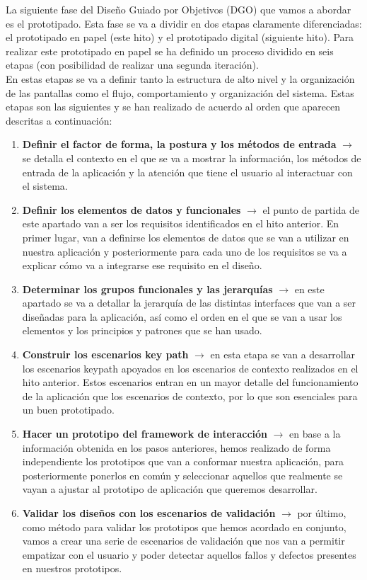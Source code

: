 
La siguiente fase del Diseño Guiado por Objetivos (DGO) que vamos a abordar es
el prototipado. Esta fase se va a dividir en dos etapas claramente
diferenciadas: el prototipado en papel (este hito) y el prototipado digital
(siguiente hito). Para realizar este prototipado en papel se ha definido un
proceso dividido en seis etapas (con posibilidad de realizar una segunda
iteración). \\

En estas etapas se va a definir tanto la estructura de alto nivel y la
organización de las pantallas como el flujo, comportamiento y organización del
sistema. Estas etapas son las siguientes y se han realizado de acuerdo al orden
que aparecen descritas a continuación:
\begin{enumerate}
    \item \textbf{Definir el factor de forma, la postura y los métodos de entrada} $\rightarrow$ se detalla el contexto en el que se va a mostrar la información, los
    métodos de entrada de la aplicación y la atención que tiene el usuario al interactuar con el sistema.
    \item \textbf{Definir los elementos de datos y funcionales} $\rightarrow$ el punto de partida de este apartado van a ser los requisitos identificados en el hito anterior.
    En primer lugar, van a definirse los elementos de datos que se van a utilizar en nuestra aplicación y posteriormente para cada uno de los requisitos se va a explicar
    cómo va a integrarse ese requisito en el diseño.
    \item \textbf{Determinar los grupos funcionales y las jerarquías} $\rightarrow$ en este apartado se va a detallar la jerarquía de las distintas interfaces que van a 
    ser diseñadas para la aplicación, así como el orden en el que se van a usar los elementos y los principios y patrones que se han usado.
    \item \textbf{Construir los escenarios key path} $\rightarrow$ en esta etapa se van a desarrollar los escenarios keypath apoyados en los escenarios de contexto realizados
    en el hito anterior. Estos escenarios entran en un mayor detalle del funcionamiento de la aplicación que los escenarios de contexto, por lo que son esenciales para
    un buen prototipado.
    \item \textbf{Hacer un prototipo del framework de interacción} $\rightarrow$ en base a la información obtenida en los pasos anteriores, hemos realizado de forma independiente
    los prototipos que van a conformar nuestra aplicación, para posteriormente ponerlos en común y seleccionar aquellos que realmente se vayan a ajustar al prototipo de
    aplicación que queremos desarrollar.
    \item \textbf{Validar los diseños con los escenarios de validación} $\rightarrow$ por último, como método para validar los prototipos que hemos acordado en conjunto,
    vamos a crear una serie de escenarios de validación que nos van a permitir empatizar con el usuario y poder detectar aquellos fallos y defectos presentes en nuestros
    prototipos.
\end{enumerate}

